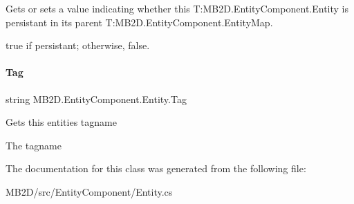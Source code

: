 Gets or sets a value indicating whether this T\+:\+M\+B2\+D.\+Entity\+Component.\+Entity is persistant in its parent T\+:\+M\+B2\+D.\+Entity\+Component.\+Entity\+Map. 

{\ttfamily true} if persistant; otherwise, {\ttfamily false}.\hypertarget{class_m_b2_d_1_1_entity_component_1_1_entity_aa16727c7f2228b661fe6b374721fb4f7}{}\label{class_m_b2_d_1_1_entity_component_1_1_entity_aa16727c7f2228b661fe6b374721fb4f7} 
\paragraph{\texorpdfstring{Tag}{Tag}}
{\footnotesize\ttfamily string M\+B2\+D.\+Entity\+Component.\+Entity.\+Tag\hspace{0.3cm}{\ttfamily [get]}}



Gets this entities tagname 

The tagname

The documentation for this class was generated from the following file\+:\begin{DoxyCompactItemize}
\item 
M\+B2\+D/src/\+Entity\+Component/Entity.\+cs\end{DoxyCompactItemize}

